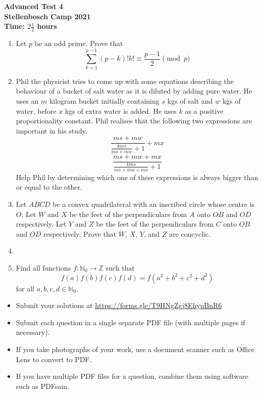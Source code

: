 \documentclass{article}
\begin{document}
\thispagestyle{empty}

\begin{center}
  \textbf{\Large Advanced Test 4}
  \\ \vspace{1em}
  \textbf{\large Stellenbosch Camp 2021}
  \\ \vspace{1em}
  \textbf{\large Time: $2\frac{1}{2}$ hours}
\end{center}

\bigskip

\begin{enumerate}[itemsep=\fill]

\item %
Let $p$ be an odd prime. Prove that
\[
	\sum_{k=1}^{p-1} (p-k)!k! \equiv \frac{p-1}{2} \pmod{p}
\]


\item %
Phil the physicist tries to come up with some equations describing the behaviour of a bucket of salt water as it is diluted by adding pure water. He uses an $m$ kilogram bucket initially containing $s$ kgs of salt and $w$ kgs of water, before $x$ kgs of extra water is added. He uses $k$ as a positive proportionality constant. Phil realises that the following two expressions are important in his study. 
$$\frac{ms+mw}{\frac{kms}{ms+mw}+1} + mx$$
$$\frac{ms+mw+mx}{\frac{kms}{ms+mw+mx}+1}$$
Help Phil by determining which one of these expressions is always bigger than or equal to the other.

\item %
Let $ABCD$ be a convex quadrilateral with an inscribed circle whose centre is $O$. Let $W$ and $X$ be the feet of the perpendiculars from $A$ onto $OB$ and $OD$ respectively. Let $Y$ and $Z$ be the feet of the perpendiculars from $C$ onto $OB$ and $OD$ respectively. Prove that $W$, $X$, $Y$, and $Z$ are concyclic.


\item %


\item %
Find all functions $f : \mathbb{N}_0 \to \mathbb{Z}$ such that
\[
  f(a) f(b) f(c) f(d) = f\left(a^2 + b^2 + c^2 + d^2\right)
\]
for all $a, b, c, d \in \mathbb{N}_0$.

\end{enumerate}


\vfill
\begin{itemize}
	\item Submit your solutions at \href{https://forms.gle/T9HNgZgj8EhypBnR6}{https://forms.gle/T9HNgZgj8EhypBnR6}
	\item Submit each question in a single separate PDF file (with multiple pages if necessary).
	\item If you take photographs of your work, use a document scanner such as Office Lens to convert to PDF.
	\item If you have multiple PDF files for a question, combine them using software such as PDFsam.
\end{itemize}
\end{document}
